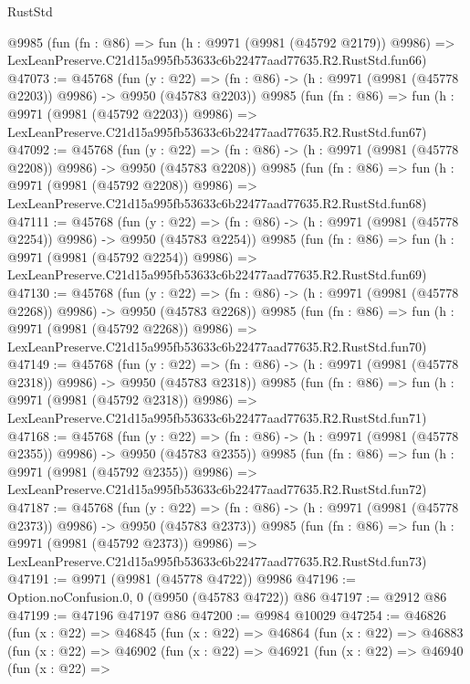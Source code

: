 \begin{lexlean}{RustStd}
\begin{coremodule}
    @9985
    (fun (fn : @86) =>
    fun (h : @9971 (@9981 (@45792 @2179)) @9986) =>
    LexLeanPreserve.C21d15a995fb53633c6b22477aad77635.R2.RustStd.fun66)
@47073 := @45768
    (fun (y : @22) =>
    (fn : @86) -> (h : @9971 (@9981 (@45778 @2203)) @9986) -> @9950 (@45783 @2203))
    @9985
    (fun (fn : @86) =>
    fun (h : @9971 (@9981 (@45792 @2203)) @9986) =>
    LexLeanPreserve.C21d15a995fb53633c6b22477aad77635.R2.RustStd.fun67)
@47092 := @45768
    (fun (y : @22) =>
    (fn : @86) -> (h : @9971 (@9981 (@45778 @2208)) @9986) -> @9950 (@45783 @2208))
    @9985
    (fun (fn : @86) =>
    fun (h : @9971 (@9981 (@45792 @2208)) @9986) =>
    LexLeanPreserve.C21d15a995fb53633c6b22477aad77635.R2.RustStd.fun68)
@47111 := @45768
    (fun (y : @22) =>
    (fn : @86) -> (h : @9971 (@9981 (@45778 @2254)) @9986) -> @9950 (@45783 @2254))
    @9985
    (fun (fn : @86) =>
    fun (h : @9971 (@9981 (@45792 @2254)) @9986) =>
    LexLeanPreserve.C21d15a995fb53633c6b22477aad77635.R2.RustStd.fun69)
@47130 := @45768
    (fun (y : @22) =>
    (fn : @86) -> (h : @9971 (@9981 (@45778 @2268)) @9986) -> @9950 (@45783 @2268))
    @9985
    (fun (fn : @86) =>
    fun (h : @9971 (@9981 (@45792 @2268)) @9986) =>
    LexLeanPreserve.C21d15a995fb53633c6b22477aad77635.R2.RustStd.fun70)
@47149 := @45768
    (fun (y : @22) =>
    (fn : @86) -> (h : @9971 (@9981 (@45778 @2318)) @9986) -> @9950 (@45783 @2318))
    @9985
    (fun (fn : @86) =>
    fun (h : @9971 (@9981 (@45792 @2318)) @9986) =>
    LexLeanPreserve.C21d15a995fb53633c6b22477aad77635.R2.RustStd.fun71)
@47168 := @45768
    (fun (y : @22) =>
    (fn : @86) -> (h : @9971 (@9981 (@45778 @2355)) @9986) -> @9950 (@45783 @2355))
    @9985
    (fun (fn : @86) =>
    fun (h : @9971 (@9981 (@45792 @2355)) @9986) =>
    LexLeanPreserve.C21d15a995fb53633c6b22477aad77635.R2.RustStd.fun72)
@47187 := @45768
    (fun (y : @22) =>
    (fn : @86) -> (h : @9971 (@9981 (@45778 @2373)) @9986) -> @9950 (@45783 @2373))
    @9985
    (fun (fn : @86) =>
    fun (h : @9971 (@9981 (@45792 @2373)) @9986) =>
    LexLeanPreserve.C21d15a995fb53633c6b22477aad77635.R2.RustStd.fun73)
@47191 := @9971 (@9981 (@45778 @4722)) @9986
@47196 := Option.noConfusion.{0, 0} (@9950 (@45783 @4722)) @86
@47197 := @2912 @86
@47199 := @47196 @47197 @86
@47200 := @9984 @10029
@47254 := @46826
    (fun (x : @22) =>
    @46845
      (fun (x : @22) =>
      @46864
        (fun (x : @22) =>
        @46883
          (fun (x : @22) =>
          @46902
            (fun (x : @22) =>
            @46921
              (fun (x : @22) =>
              @46940
                (fun (x : @22) =>

\end{coremodule}
\end{lexlean}
